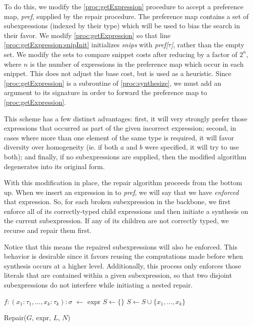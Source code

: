 To do this, we modify the \ref{proc:getExpression} procedure to accept a preference map, \textit{pref}, supplied by the repair procedure. The preference map contains a set of subexpressions (indexed by their type) which will be used to bias the search in their favor. We modify \ref{proc:getExpression} so that line \ref{proc:getExpression:snipInit} initializes \textit{snips} with \textit{pref[$\tau$]}, rather than the empty set. We modify the sets to compare snippet costs after reducing by a factor of $2^{n}$, where $n$ is the number of expressions in the preference map which occur in each snippet. This does not adjust the base cost, but is used as a heuristic. Since \ref{proc:getExpression} is a subroutine of \ref{proc:synthesize}, we must add an argument to its signature in order to forward the preference map to \ref{proc:getExpression}.

This scheme has a few distinct advantages: first, it will very strongly prefer those expressions that occurred as part of the given incorrect expression; second, in cases where more than one element of the same type is required, it will favor diversity over homogeneity (ie. if both $a$ and $b$ were specified, it will try to use both); and finally, if no subexpressions are supplied, then the modified algorithm degenerates into its original form.

With this modification in place, the repair algorithm proceeds from the bottom up. When we insert an expression  in to \textit{pref}, we will say that we have \textit{enforced} that expression. So, for each broken subexpression in the backbone, we first enforce all of its correctly-typed child expressions and then initiate a synthesis on the current subexpression. If any of its children are not correctly typed, we recurse and repair them first.

Notice that this means the repaired subexpressions will also be enforced. This behavior is desirable since it favors reusing the computations made before when synthesis occurs at a higher level. Additionally, this process  only enforces those literals that are contained within a given subexpression, so that two disjoint subexpressions do not interfere while initiating a nested repair.

\begin{procedure}
$f: (x_1: \tau_1, \ldots, x_k: \tau_k): \sigma$ $\leftarrow$ expr\;
$S \leftarrow \{\}$ \;
$S \leftarrow S \cup \{x_1,\ldots,x_k\}$ \;
\caption{Repair($G$, expr, $L$, $N$)}\label{proc:repair}
\end{procedure}

\lipsum[1-19]
